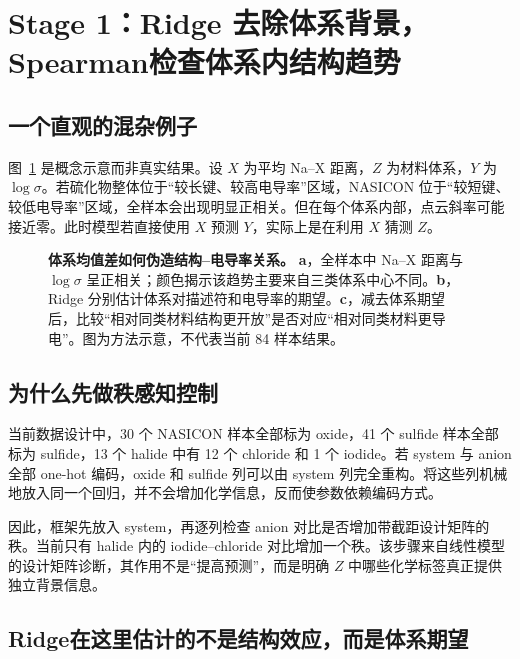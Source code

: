 \section{Stage 1：Ridge 去除体系背景，Spearman检查体系内结构趋势}

\subsection{一个直观的混杂例子}

图~\ref{fig:confoundingexample} 是概念示意而非真实结果。设 $X$ 为平均 Na--X 距离，$Z$ 为材料体系，$Y$ 为 $\log\sigma$。若硫化物整体位于“较长键、较高电导率”区域，NASICON 位于“较短键、较低电导率”区域，全样本会出现明显正相关。但在每个体系内部，点云斜率可能接近零。此时模型若直接使用 $X$ 预测 $Y$，实际上是在利用 $X$ 猜测 $Z$。

\begin{figure}[htbp]
\centering
\resizebox{\textwidth}{!}{}
\caption{\textbf{体系均值差如何伪造结构--电导率关系。} \textbf{a}，全样本中 Na--X 距离与 $\log\sigma$ 呈正相关；颜色揭示该趋势主要来自三类体系中心不同。\textbf{b}，Ridge 分别估计体系对描述符和电导率的期望。\textbf{c}，减去体系期望后，比较“相对同类材料结构更开放”是否对应“相对同类材料更导电”。图为方法示意，不代表当前 84 样本结果。}
\label{fig:confoundingexample}
\end{figure}

\subsection{为什么先做秩感知控制}

当前数据设计中，30 个 NASICON 样本全部标为 oxide，41 个 sulfide 样本全部标为 sulfide，13 个 halide 中有 12 个 chloride 和 1 个 iodide。若 system 与 anion 全部 one-hot 编码，oxide 和 sulfide 列可以由 system 列完全重构。将这些列机械地放入同一个回归，并不会增加化学信息，反而使参数依赖编码方式。

因此，框架先放入 system，再逐列检查 anion 对比是否增加带截距设计矩阵的秩。当前只有 halide 内的 iodide--chloride 对比增加一个秩。该步骤来自线性模型的设计矩阵诊断，其作用不是“提高预测”，而是明确 $Z$ 中哪些化学标签真正提供独立背景信息。

\subsection{Ridge在这里估计的不是结构效应，而是体系期望}

